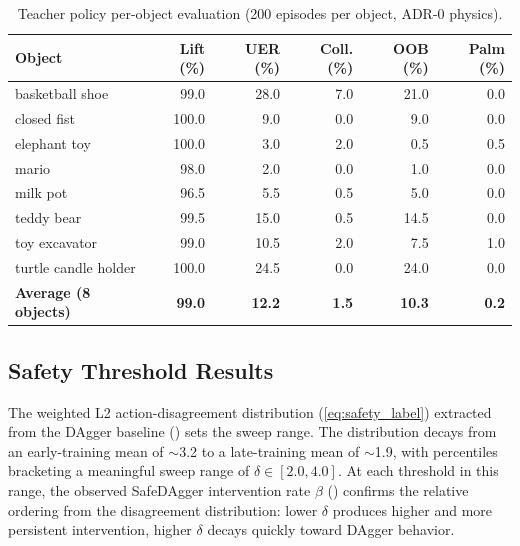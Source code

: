 \begin{table}[htb]
    \centering
    \caption{Teacher policy per-object evaluation (200 episodes per object, ADR-0 physics).}
    \label{tab:teacher_eval}
    \small
    \begin{tabular}{lrrrrr}
        \toprule
        \textbf{Object} & \textbf{Lift (\%)} & \textbf{UER (\%)} & \textbf{Coll. (\%)} & \textbf{OOB (\%)} & \textbf{Palm (\%)} \\
        \midrule
        basketball shoe       &  99.0 & 28.0 &  7.0 & 21.0 &  0.0 \\
        closed fist           & 100.0 &  9.0 &  0.0 &  9.0 &  0.0 \\
        elephant toy          & 100.0 &  3.0 &  2.0 &  0.5 &  0.5 \\
        mario                 &  98.0 &  2.0 &  0.0 &  1.0 &  0.0 \\
        milk pot              &  96.5 &  5.5 &  0.5 &  5.0 &  0.0 \\
        teddy bear            &  99.5 & 15.0 &  0.5 & 14.5 &  0.0 \\
        toy excavator         &  99.0 & 10.5 &  2.0 &  7.5 &  1.0 \\
        turtle candle holder  & 100.0 & 24.5 &  0.0 & 24.0 &  0.0 \\
        \midrule
        \textbf{Average (8 objects)} & \textbf{99.0} & \textbf{12.2} & \textbf{1.5} & \textbf{10.3} & \textbf{0.2} \\
        \bottomrule
    \end{tabular}
\end{table}

\subsection{Safety Threshold Results}%
\label{sec:threshold_results}%

The weighted L2 action-disagreement distribution (\cref{eq:safety_label}) extracted from the DAgger baseline () sets the sweep range.
The distribution decays from an early-training mean of $\sim$3.2 to a late-training mean of $\sim$1.9, with percentiles bracketing a meaningful sweep range of $\delta \in [2.0, 4.0]$.
At each threshold in this range, the observed SafeDAgger intervention rate $\beta$ () confirms the relative ordering from the disagreement distribution: lower $\delta$ produces higher and more persistent intervention, higher $\delta$ decays quickly toward DAgger behavior.

